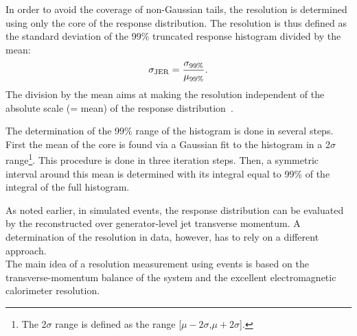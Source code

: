 In order to avoid the coverage of non-Gaussian tails, the resolution is determined using only the core of the response distribution.
The resolution is thus defined as the standard deviation of the 99\% truncated response histogram divided by the mean:
\begin{equation*}\label{res:eq:resolutionFormula}
\sigma_\mathrm{JER} = \frac{\sigma_{99\%}}{\mu_{99\%}}.
\end{equation*}
The division by the mean aims at making the resolution independent of the absolute scale (= mean) of the response distribution~\cite{bib:CMS-AN-2010-076}.

The determination of the 99\% range of the histogram is done in several steps. 
First the mean of the core is found via a Gaussian fit to the histogram in a 2$\sigma$ range\footnote{The 2$\sigma$ range is defined as the range [$\mu - 2\sigma$,$\mu + 2\sigma$].}. 
This procedure is done in three iteration steps.
Then, a symmetric interval around this mean is determined with its integral equal to 99\% of the integral of the full histogram. 

As noted earlier, in simulated events, the response distribution can be evaluated by the reconstructed over generator-level jet transverse momentum.
A determination of the resolution in data, however, has to rely on a different approach.\\



The main idea of a resolution measurement using \GAMJET events is based on the transverse-momentum balance of the \GAMJET system and the excellent electromagnetic calorimeter resolution.


